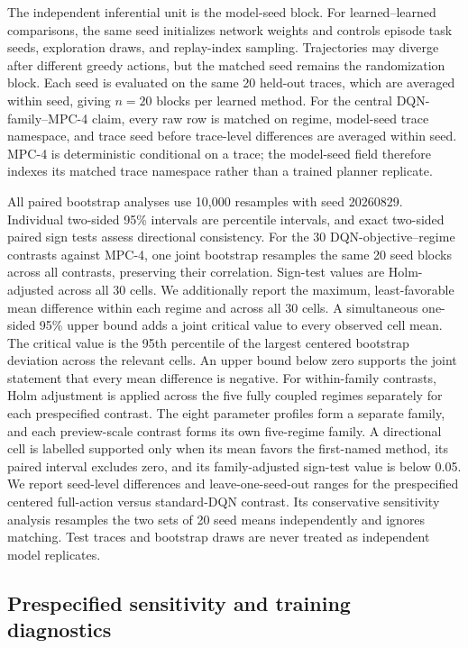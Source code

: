 \documentclass[11pt]{article}
\begin{document}
The independent inferential unit is the model-seed block. For learned--learned comparisons, the same seed initializes network weights and controls episode task seeds, exploration draws, and replay-index sampling. Trajectories may diverge after different greedy actions, but the matched seed remains the randomization block. Each seed is evaluated on the same 20 held-out traces, which are averaged within seed, giving $n=20$ blocks per learned method. For the central DQN-family--MPC-4 claim, every raw row is matched on regime, model-seed trace namespace, and trace seed before trace-level differences are averaged within seed. MPC-4 is deterministic conditional on a trace; the model-seed field therefore indexes its matched trace namespace rather than a trained planner replicate.

All paired bootstrap analyses use 10,000 resamples with seed 20260829. Individual two-sided 95\% intervals are percentile intervals, and exact two-sided paired sign tests assess directional consistency. For the 30 DQN-objective--regime contrasts against MPC-4, one joint bootstrap resamples the same 20 seed blocks across all contrasts, preserving their correlation. Sign-test values are Holm-adjusted across all 30 cells. We additionally report the maximum, least-favorable mean difference within each regime and across all 30 cells. A simultaneous one-sided 95\% upper bound adds a joint critical value to every observed cell mean. The critical value is the 95th percentile of the largest centered bootstrap deviation across the relevant cells. An upper bound below zero supports the joint statement that every mean difference is negative. For within-family contrasts, Holm adjustment is applied across the five fully coupled regimes separately for each prespecified contrast. The eight parameter profiles form a separate family, and each preview-scale contrast forms its own five-regime family. A directional cell is labelled supported only when its mean favors the first-named method, its paired interval excludes zero, and its family-adjusted sign-test value is below 0.05. We report seed-level differences and leave-one-seed-out ranges for the prespecified centered full-action versus standard-DQN contrast. Its conservative sensitivity analysis resamples the two sets of 20 seed means independently and ignores matching. Test traces and bootstrap draws are never treated as independent model replicates.

\subsection{Prespecified sensitivity and training diagnostics}
\end{document}

